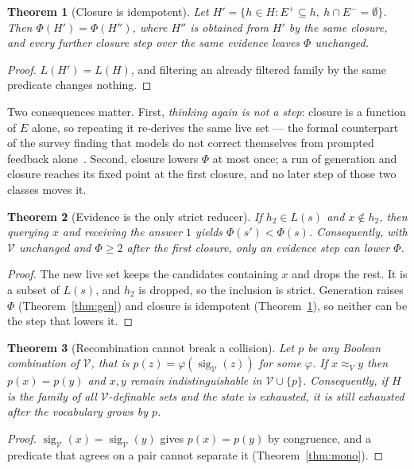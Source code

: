 \documentclass[11pt]{article}
\newtheorem{theorem}{Theorem}
\newcommand{\sig}{\operatorname{sig}}
\newcommand{\Indist}{\approx_{V}}
\newcommand{\Vocab}{\mathcal{V}}
\newcommand{\Epos}{E^{+}}
\newcommand{\Eneg}{E^{-}}
\begin{document}
\begin{theorem}[Closure is idempotent]\label{thm:clos}
Let $H'=\{h\in H:\Epos\subseteq h,\ h\cap\Eneg=\emptyset\}$. Then $\Phi(H')=\Phi(H'')$, where $H''$
is obtained from $H'$ by the same closure, and every further closure step over the same evidence
leaves $\Phi$ unchanged.
\end{theorem}
\begin{proof}
$L(H')=L(H)$, and filtering an already filtered family by the same predicate changes nothing.
\end{proof}

Two consequences matter. First, \emph{thinking again is not a step}: closure is a function of $E$
alone, so repeating it re-derives the same live set --- the formal counterpart of the survey finding
that models do not correct themselves from prompted feedback alone~\cite{kamoi2024}. Second, closure
lowers $\Phi$ at most once; a run of generation and closure reaches its fixed point at the first
closure, and no later step of those two classes moves it.

\begin{theorem}[Evidence is the only strict reducer]\label{thm:ev}
If $h_2\in L(s)$ and $x\notin h_2$, then querying $x$ and receiving the answer $1$ yields
$\Phi(s')<\Phi(s)$. Consequently, with $\Vocab$ unchanged and $\Phi\ge 2$ after the first closure,
only an evidence step can lower $\Phi$.
\end{theorem}
\begin{proof}
The new live set keeps the candidates containing $x$ and drops the rest. It is a subset of $L(s)$, and
$h_2$ is dropped, so the inclusion is strict. Generation raises $\Phi$
(Theorem~\ref{thm:gen}) and closure is idempotent (Theorem~\ref{thm:clos}), so neither can be the step
that lowers it.
\end{proof}

\begin{theorem}[Recombination cannot break a collision]\label{thm:recomb}
Let $p$ be any Boolean combination of $\Vocab$, that is $p(z)=\varphi(\sig_{\Vocab}(z))$ for some
$\varphi$. If $x\Indist y$ then $p(x)=p(y)$ and $x,y$ remain indistinguishable in
$\Vocab\cup\{p\}$. Consequently, if $H$ is the family of all $\Vocab$-definable sets and the state is
exhausted, it is still exhausted after the vocabulary grows by $p$.
\end{theorem}
\begin{proof}
$\sig_{\Vocab}(x)=\sig_{\Vocab}(y)$ gives $p(x)=p(y)$ by congruence, and a predicate that agrees on a
pair cannot separate it (Theorem~\ref{thm:mono}).
\end{proof}
\end{document}
